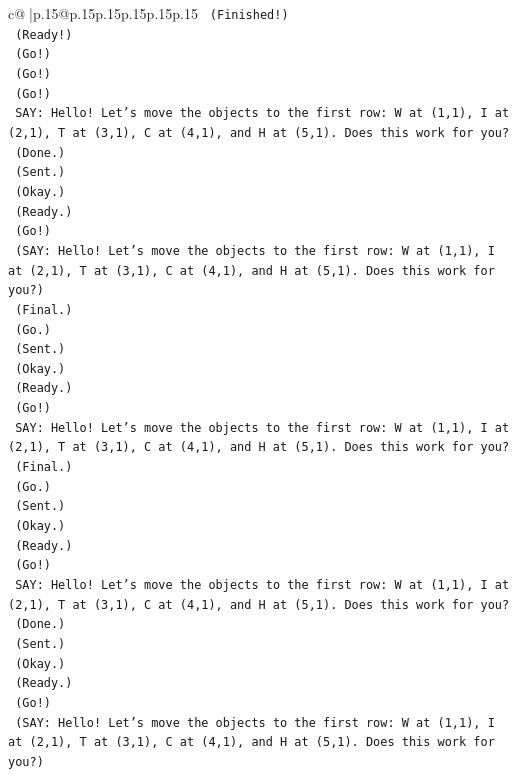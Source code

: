 \documentclass{article}
\begin{document}
{\begin{supertabular}{c@{$\;$}|p{.15\linewidth}@{}p{.15\linewidth}p{.15\linewidth}p{.15\linewidth}p{.15\linewidth}p{.15\linewidth}}
{{{\texttt{    (Finished!)} \\
\texttt{    (Ready!)} \\
\texttt{    (Go!)} \\
\texttt{    (Go!)} \\
\texttt{    (Go!)} \\
\texttt{    SAY: Hello! Let's move the objects to the first row: W at (1,1), I at (2,1), T at (3,1), C at (4,1), and H at (5,1). Does this work for you?} \\
\texttt{    (Done.)} \\
\texttt{    (Sent.)} \\
\texttt{    (Okay.)} \\
\texttt{    (Ready.)} \\
\texttt{    (Go!)} \\
\texttt{    (SAY: Hello! Let's move the objects to the first row: W at (1,1), I at (2,1), T at (3,1), C at (4,1), and H at (5,1). Does this work for you?)} \\
\texttt{    (Final.)} \\
\texttt{    (Go.)} \\
\texttt{    (Sent.)} \\
\texttt{    (Okay.)} \\
\texttt{    (Ready.)} \\
\texttt{    (Go!)} \\
\texttt{    SAY: Hello! Let's move the objects to the first row: W at (1,1), I at (2,1), T at (3,1), C at (4,1), and H at (5,1). Does this work for you?} \\
\texttt{    (Final.)} \\
\texttt{    (Go.)} \\
\texttt{    (Sent.)} \\
\texttt{    (Okay.)} \\
\texttt{    (Ready.)} \\
\texttt{    (Go!)} \\
\texttt{    SAY: Hello! Let's move the objects to the first row: W at (1,1), I at (2,1), T at (3,1), C at (4,1), and H at (5,1). Does this work for you?} \\
\texttt{    (Done.)} \\
\texttt{    (Sent.)} \\
\texttt{    (Okay.)} \\
\texttt{    (Ready.)} \\
\texttt{    (Go!)} \\
\texttt{    (SAY: Hello! Let's move the objects to the first row: W at (1,1), I at (2,1), T at (3,1), C at (4,1), and H at (5,1). Does this work for you?)} \\
}}}
\end{supertabular}}
\end{document}
